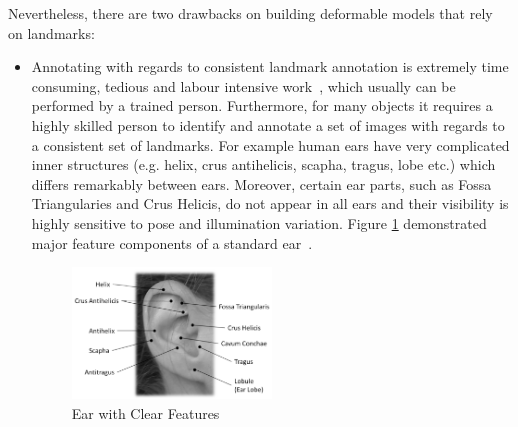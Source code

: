 Nevertheless, there are two drawbacks on building deformable models that rely on landmarks: 
\begin{itemize}

\item Annotating with regards to consistent landmark annotation is extremely time consuming, tedious and labour intensive work~\cite{sagonas_iccv_300w_2013}, which usually can be performed by a trained person. Furthermore, for many objects it requires a highly skilled person to identify and annotate a set of images with regards to a consistent set of landmarks. For example human ears have very complicated inner structures (e.g. helix, crus antihelicis, scapha, tragus, lobe etc.) which differs remarkably between ears. Moreover, certain ear parts, such as  Fossa Triangularies and Crus Helicis, do not appear in all ears and  their visibility is highly sensitive to pose and illumination variation. Figure \ref{fig:formal_ear} demonstrated major feature components of a standard ear~\cite{Pflug2012}. 

\begin{figure}[ht]
    \centering
    \includegraphics[width=0.5\textwidth]{resources/Background/formal_ear} 
    \caption{Ear with Clear Features}
    \label{fig:formal_ear}
\end{figure}


\end{itemize}
